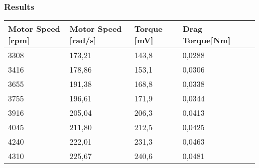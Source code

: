 \subsubsection{Results}
\begin{table}[H]
	\centering
	\begin{tabular}{|l|l|l|l|p{4.3cm}|}
		\hline%
		\textbf{Motor Speed [rpm]}    & \textbf{Motor Speed [rad/s]} & \textbf{Torque [mV]}  & \textbf{Drag Torque[Nm]} \\ 
		\hline%
		3308 						       &  173,21 				           & 143,8                 & 0,0288         \\
		\hline%
		3416                               &  178,86   			               & 153,1                 & 0,0306         \\
		\hline%
		3655                               &  191,38  			               & 168,8                 & 0,0338         \\
		\hline%
		3755                               &  196,61                           & 171,9                 & 0,0344         \\
		\hline%
		3916 						       &  205,04				           & 206,3                 & 0,0413         \\
		\hline%
		4045                               &  211,80    			           & 212,5                 & 0,0425         \\
		\hline%
		4240                               &  222,01                           & 231,3                 & 0,0463         \\
		\hline%
		4310 						       &  225,67				           & 240,6                 & 0,0481         \\
		\hline%
				
	\end{tabular}
\end{table}
